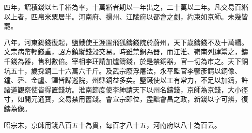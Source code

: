 \begin{pinyinscope}
 四年，詔積錢以七千緡為率，十萬緡者期以一年出之，二十萬以二年。凡交易百緡以上者，匹帛米粟居半。河南府、揚州、江陵府以都會之劇，約束如京師。未幾皆罷。



 八年，河東錫錢復起，鹽鐵使王涯置飛狐鑄錢院於蔚州，天下歲鑄錢不及十萬緡。文宗病幣輕錢重，詔方鎮縱錢穀交易。時雖禁銅為器，而江淮、嶺南列肆鬻之，鑄千錢為器，售利數倍。宰相李玨請加爐鑄錢，於是禁銅器，官一切為市之。天下銅坑五十，歲採銅二十六萬六千斤。及武宗廢浮屠法，永平監官李鬱彥請以銅像、鐘、磬、金盧、鐸皆歸巡院，州縣銅益多矣。鹽鐵使以工有常力，不足以加鑄，許諸道觀察使皆得置錢坊。淮南節度使李紳請天下以州名鑄錢，京師為京錢，大小徑寸，如開元通寶，交易禁用舊錢。會宣宗即位，盡黜會昌之政，新錢以字可辨，復鑄為像。



 昭宗末，京師用錢八百五十為貫，每百才八十五，河南府以八十為百云。



\end{pinyinscope}